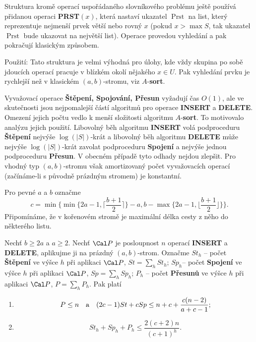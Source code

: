 \documentclass[a4paper,12pt]{article}
\def \emph#1{\underbar{#1}}
\DeclareMathOperator*{\Prst}{Prst}
\begin{document}
Struktura kromě operací uspořádaného 
slovníkového prob\-lé\-mu 
ještě používá přidanou ope\-raci {\bf PRST$(x)$}, která nastaví ukazatel 
$\Prst$ na list, který reprezentuje nejmenší prvek větší 
nebo rovný $x$ (pokud $x>\max S$, tak ukazatel $\Prst$ bude 
ukazovat na největší list). Operace provedou vyhledání a 
pak pokračují klasickým způsobem.

Použití: Tato struktura je velmi výhodná pro 
úlohy, kde vždy skupina po sobě jdoucích ope\-rací  
pracuje v blízkém okolí něja\-ké\-ho $x\in U$. Pak 
vyhledání prvku je rychlejší než v klasickém 
$(a,b)$-stromu, viz $A$-{\bf sort}.

Vyvažovací operace {\bf Štěpení, Spojování, Přesun }
vyžadují čas $O(1)$, ale ve skutečnosti jsou nejpomalejší 
částí 
algoritmů pro operace {\bf INSERT} a {\bf DELETE}.  Omezení 
jejich počtu vedlo k menší složitosti algoritmu $A$-{\bf sort}.  To motivovalo analýzu 
jejich použití.\newline 
Libovolný běh algoritmu {\bf INSERT }
volá podproceduru {\bf Štěpe\-ní} nejvýše $\log(|
S|)$-krát a libovolný běh 
algoritmu  {\bf DELETE} mů\-že nejvýše $\log(|S|
)$-krát zavolat podproceduru 
{\bf Spojení }
a nejvýše jednou podproceduru {\bf Přesun}.  V obecném 
případě tyto od\-ha\-dy nejdou zlepšit.  Pro vhodný typ 
$(a,b)$-stromu však amortizovaný počet vyvažovacích 
ope\-rací (začínáme-li s  
pů\-vod\-ně práz\-dným stromem) je konstantní.

Pro pevné $a$ a $b$ označme 
$$c=\min\{\min\{2a-1,\lceil\frac {b+1}2\rceil \}-a,b-\max\{2a-1,\lfloor\frac {
b+1}2\rfloor \}\}.$$
Připomínáme, že \emph{výška} \emph{vrcholu} v kořenovém stromě je 
maximální délka cesty z něho do některého listu.

Nechť $b\ge 2a$ a $a\ge 2$. Nechť $\Cal P$ je 
posloupnost $n$ operací {\bf INSERT} a {\bf DELETE}, aplikujme ji na 
prázdný $(a,b)$-strom. Označme\newline 
$St_h$ -- počet {\bf Štěpení} ve výšce $h$ při aplikaci $
\Cal P$, $St=\sum_hSt_h$;\newline 
$Sp_h$-- počet {\bf Spojení} ve výšce $h$ při aplikaci $
\Cal P$, 
$Sp=\sum_hSp_h$;\newline 
$P_h$ -- počet {\bf Přesunů} ve výšce $h$ při aplikaci $
\Cal P$, 
$P=\sum_hP_h$.\newline 
Pak platí
\begin{enumerate}
\item
$$P\le n\quad \text{\rm a}\quad (2c-1)St+cSp\le n+c+\frac {c(n-2)}{a+c-1};$$
\item
$$St_h+Sp_h+P_h\le\frac {2(c+2)n}{(c+1)^h}.$$
\end{enumerate}
\endproclaim
\end{document}
